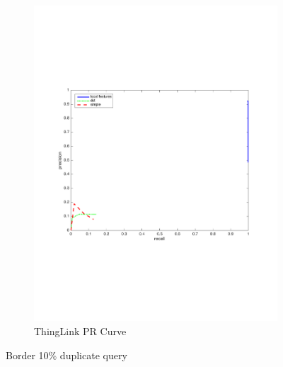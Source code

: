\documentclass[english,12pt,a4paper,pdftex,elec,utf8, table]{aaltothesis}
\begin{document}
\begin{figure}[htb]
\begin{center}
\begin{subfigure}[b]{0.49\textwidth}
    \includegraphics[width=\textwidth]{figures/thinglink_Border10PR.pdf}
    \caption{ThingLink PR Curve}
    \label{Borderprthinglink}
  \end{subfigure}
  \caption{Border 10\% duplicate query}
  \end{center}
\end{figure}
\end{document}
